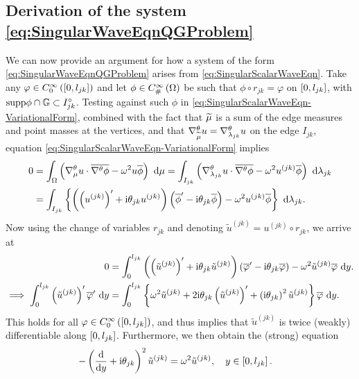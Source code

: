 \subsection{Derivation of the system \eqref{eq:SingularWaveEqnQGProblem}} \label{ssec:Scalar-QGDerivation}
We can now provide an argument for how a system of the form \eqref{eq:SingularWaveEqnQGProblem} arises from \eqref{eq:SingularScalarWaveEqn}.
Take any $\varphi\in C^{\infty}_{0}\left( \left[ 0,l_{jk} \right] \right)$ and let $\phi\in C^{\infty}_{\#}\left( \Omega \right)$ be such that $\phi\circ r_{jk} = \varphi$ on $\left[ 0,l_{jk} \right]$, with $\mathrm{supp}\phi\cap\mathbb{G}\subset I_{jk}^{\circ}$.
Testing against such $\phi$ in \eqref{eq:SingularScalarWaveEqn-VariationalForm}, combined with the fact that $\widetilde{\mu}$ is a sum of the edge measures and point masses at the vertices, and that $\nabla^{\theta}_{\widetilde{\mu}}u=\nabla^{\theta}_{\lambda_{jk}}u$ on the edge $I_{jk}$, equation \eqref{eq:SingularScalarWaveEqn-VariationalForm} implies
\begin{align*}
	0 &= \int_{\Omega} \left( \nabla^{\theta}_\mu u \cdot \overline{\nabla^{\theta}\phi} - \omega^2 u\overline{\phi} \right)  \ \mathrm{d}\mu
	= \int_{I_{jk}} \left( \nabla^{\theta}_{\lambda_{jk}}u \cdot \overline{\nabla^{\theta}\phi} - \omega^2 u^{(jk)}\overline{\phi} \right)  \ \mathrm{d}\lambda_{jk} \\
	&= \int_{I_{jk}} \left\{  \left( \left( u^{(jk)} \right)' + \mathrm{i}\theta_{jk} u^{(jk)} \right)\left( \overline{\phi}' - \mathrm{i}\theta_{jk} \overline{\phi}  \right) - \omega^2 u^{(jk)}\overline{\phi}  \right\}  \ \mathrm{d}\lambda_{jk}.
\end{align*}
Now using the change of variables $r_{jk}$ and denoting $\tilde{u}^{(jk)} = u^{(jk)} \circ r_{jk}$, we arrive at
\begin{align*}
	0 &= \int_{0}^{l_{jk}} \left( \left( \tilde{u}^{(jk)} \right)' + \mathrm{i}\theta_{jk} \tilde{u}^{(jk)} \right)\left( \overline{\varphi}' - \mathrm{i}\theta_{jk} \overline{\varphi}  \right) - \omega^2 \tilde{u}^{(jk)}\overline{\varphi} \ \mathrm{d} y. \\
	\implies
	\int_{0}^{l_{jk}} \left( \tilde{u}^{(jk)} \right)'\overline{\varphi}' \ \mathrm{d} y &=
	\int_{0}^{l_{jk}} \left\{  \omega^2\tilde{u}^{(jk)} + 2\mathrm{i}\theta_{jk}\left( \tilde{u}^{(jk)} \right)' + \left( \mathrm{i}\theta_{jk} \right)^2\tilde{u}^{(jk)}  \right\} \overline{\varphi} \ \mathrm{d} y.
\end{align*}
This holds for all $\varphi\in C^{\infty}_{0}\left( \left[ 0,l_{jk} \right] \right)$, and thus implies that $\tilde{u}^{(jk)}$ is twice (weakly) differentiable along $\left[ 0,l_{jk} \right]$.
Furthermore, we then obtain the (strong) equation
\begin{align*}
	-\left( \dfrac{\mathrm{d}}{\mathrm{d}y} + \mathrm{i}\theta_{jk} \right)^2 \tilde{u}^{(jk)} &= \omega^2 \tilde{u}^{(jk)}, \quad y\in\left[ 0,l_{jk} \right].
\end{align*}

